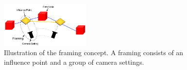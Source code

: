 \begin{figure}[htbp]
\centering
\includegraphics[width=0.4\textwidth]{Pics/Instructions}
\caption{Illustration of the framing concept. A framing consists of an influence point and a group of camera settings.}
\label{fig:framingConcept}
\end{figure}

